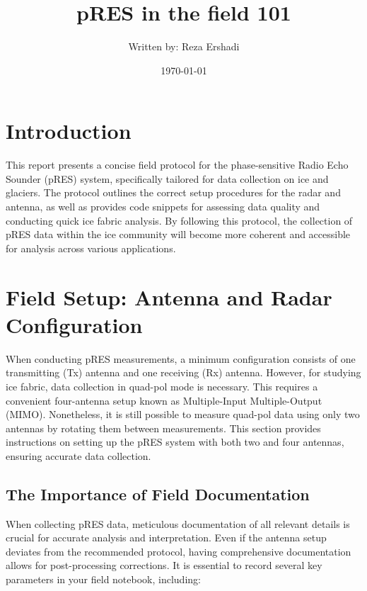 \documentclass[a4paper,12pt]{article}
\title{pRES in the field 101}
\author{Written by: Reza Ershadi}
\date{\today}
\begin{document}
\maketitle

\section{Introduction}
This report presents a concise field protocol for the phase-sensitive Radio Echo Sounder (pRES)
system, specifically tailored for data collection on ice and glaciers. The protocol outlines the
correct setup procedures for the radar and antenna, as well as provides code snippets for assessing
data quality and conducting quick ice fabric analysis. By following this protocol, the collection of
pRES data within the ice community will become more coherent and accessible for analysis across
various applications.

\section{Field Setup: Antenna and Radar Configuration}
When conducting pRES measurements, a minimum configuration consists of one transmitting (Tx) antenna
and one receiving (Rx) antenna. However, for studying ice fabric, data collection in quad-pol mode
is necessary. This requires a convenient four-antenna setup known as Multiple-Input Multiple-Output
(MIMO). Nonetheless, it is still possible to measure quad-pol data using only two antennas by
rotating them between measurements. This section provides instructions on setting up the pRES system
with both two and four antennas, ensuring accurate data collection.


\subsection{The Importance of Field Documentation}
When collecting pRES data, meticulous documentation of all relevant details is crucial for accurate
analysis and interpretation. Even if the antenna setup deviates from the recommended protocol,
having comprehensive documentation allows for post-processing corrections. It is essential to record
several key parameters in your field notebook, including:
\end{document}
